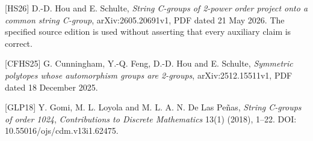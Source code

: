 {[}HS26{]} D.-D. Hou and E. Schulte, \emph{String C-groups of 2-power
order project onto a common string C-group}, arXiv:2605.20691v1, PDF
dated 21 May 2026. The specified source edition is used without
asserting that every auxiliary claim is correct.

{[}CFHS25{]} G. Cunningham, Y.-Q. Feng, D.-D. Hou and E. Schulte,
\emph{Symmetric polytopes whose automorphism groups are 2-groups},
arXiv:2512.15511v1, PDF dated 18 December 2025.

{[}GLP18{]} Y. Gomi, M. L. Loyola and M. L. A. N. De Las Peñas,
\emph{String C-groups of order 1024}, \emph{Contributions to Discrete
Mathematics} 13(1) (2018), 1--22. DOI: 10.55016/ojs/cdm.v13i1.62475.

